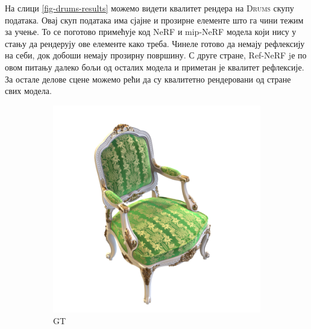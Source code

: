 \documentclass[12pt, a4paper, twoside]{book}
\numberwithin{equation}{chapter}
\numberwithin{theorem}{section}
\numberwithin{definition}{section}
\numberwithin{definitionChapter}{chapter}
\begin{document}
На слици \ref{fig-drums-results} можемо видети квалитет рендера на \textsc{Drums} скупу података.
Овај скуп података има сјајне и прозирне елементе што га чини тежим за учење. То се поготово
примећује код NeRF и mip-NeRF модела који нису у стању да рендерују ове елементе како треба. Чинеле
готово да немају рефлексију на себи, док добоши немају прозирну површину. С друге стране, Ref-NeRF jе
по овом питању далеко бољи од осталих модела и приметан је квалитет рефлексије.
За остале делове сцене можемо рећи да су квалитетно рендеровани од стране свих модела.

	\begin{figure}[H]
		\centering
		\begin{subfigure}{0.475\textwidth}
			\centering
			\includegraphics[scale=0.25]{img/gt/gt_chair_38.png}
			\caption{GT}
		\end{subfigure}
		\begin{subfigure}{0.475\textwidth}
			\centering

\end{subfigure}
\end{figure}
\end{document}
